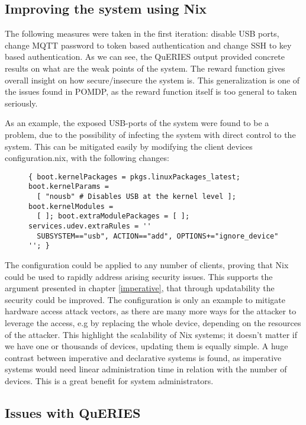 \subsection{Improving the system using Nix}

The following measures were taken in the first iteration: disable
USB ports, change MQTT password to token based authentication and change
SSH to key based authentication. As we can see, the QuERIES output
provided concrete results on what are the weak points of the
system. The reward function gives overall insight on how
secure/insecure the system is. This generalization is one of the
issues found in POMDP, as the reward function itself is too general to
taken seriously. 

As an example, the exposed USB-ports of the system were found to be a
problem, due to the possibility of infecting the system with direct
control to the system. This can be mitigated easily by modifying the
client devices configuration.nix, with the following changes:

\begin{figure}[H]
\begin{lstlisting} 
{ boot.kernelPackages = pkgs.linuxPackages_latest; boot.kernelParams =
  [ "nousb" # Disables USB at the kernel level ]; boot.kernelModules =
  [ ]; boot.extraModulePackages = [ ]; services.udev.extraRules = ''
  SUBSYSTEM=="usb", ACTION=="add", OPTIONS+="ignore_device" ''; }
\end{lstlisting}
\label{kernelsnippet}
\end{figure}

The configuration could be applied to any number of clients, proving that Nix could
be used to rapidly address arising security issues. This supports the
argument presented in chapter \ref{imperative}, that through
updatability the security could be improved. The configuration is only an example to mitigate hardware access attack
vectors, as there are many more ways for the attacker to leverage the
access, e.g by replacing the whole device, depending on the resources
of the attacker. This highlight the scalability of Nix systems; it
doesn't matter if we have one or thousands of devices, updating them
is equally simple. A huge contrast between imperative and
declarative systems is found, as imperative systems would need linear
administration time in relation with the number of devices. This is a
great benefit for system administrators.

\subsection{Issues with QuERIES} \label{issues}

